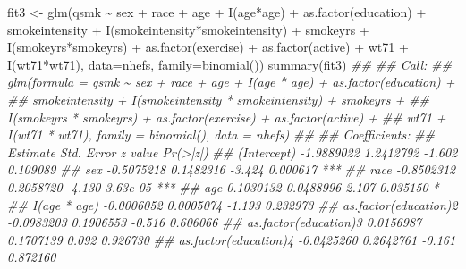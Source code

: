 \documentclass[
  10pt,
  a4paper,
]{book}
\newenvironment{Shaded}{\begin{snugshade}}{\end{snugshade}}
\newcommand{\AttributeTok}[1]{\textcolor[rgb]{0.40,0.45,0.13}{#1}}
\newcommand{\DocumentationTok}[1]{\textcolor[rgb]{0.37,0.37,0.37}{\textit{#1}}}
\newcommand{\FunctionTok}[1]{\textcolor[rgb]{0.28,0.35,0.67}{#1}}
\newcommand{\NormalTok}[1]{\textcolor[rgb]{0.00,0.46,0.62}{#1}}
\newcommand{\OtherTok}[1]{\textcolor[rgb]{0.00,0.46,0.62}{#1}}
\newcommand{\SpecialCharTok}[1]{\textcolor[rgb]{0.37,0.37,0.37}{#1}}
\begin{document}
\begin{Shaded}
\begin{Highlighting}[]
\NormalTok{fit3 }\OtherTok{\textless{}{-}} \FunctionTok{glm}\NormalTok{(qsmk }\SpecialCharTok{\textasciitilde{}}\NormalTok{ sex }\SpecialCharTok{+}\NormalTok{ race }\SpecialCharTok{+}\NormalTok{ age }\SpecialCharTok{+} \FunctionTok{I}\NormalTok{(age}\SpecialCharTok{*}\NormalTok{age) }\SpecialCharTok{+} \FunctionTok{as.factor}\NormalTok{(education)}
            \SpecialCharTok{+}\NormalTok{ smokeintensity }\SpecialCharTok{+} \FunctionTok{I}\NormalTok{(smokeintensity}\SpecialCharTok{*}\NormalTok{smokeintensity) }\SpecialCharTok{+}\NormalTok{ smokeyrs}
            \SpecialCharTok{+} \FunctionTok{I}\NormalTok{(smokeyrs}\SpecialCharTok{*}\NormalTok{smokeyrs) }\SpecialCharTok{+} \FunctionTok{as.factor}\NormalTok{(exercise) }\SpecialCharTok{+} \FunctionTok{as.factor}\NormalTok{(active)}
            \SpecialCharTok{+}\NormalTok{ wt71 }\SpecialCharTok{+} \FunctionTok{I}\NormalTok{(wt71}\SpecialCharTok{*}\NormalTok{wt71), }\AttributeTok{data=}\NormalTok{nhefs, }\AttributeTok{family=}\FunctionTok{binomial}\NormalTok{())}
\FunctionTok{summary}\NormalTok{(fit3)}
\DocumentationTok{\#\# }
\DocumentationTok{\#\# Call:}
\DocumentationTok{\#\# glm(formula = qsmk \textasciitilde{} sex + race + age + I(age * age) + as.factor(education) + }
\DocumentationTok{\#\#     smokeintensity + I(smokeintensity * smokeintensity) + smokeyrs + }
\DocumentationTok{\#\#     I(smokeyrs * smokeyrs) + as.factor(exercise) + as.factor(active) + }
\DocumentationTok{\#\#     wt71 + I(wt71 * wt71), family = binomial(), data = nhefs)}
\DocumentationTok{\#\# }
\DocumentationTok{\#\# Coefficients:}
\DocumentationTok{\#\#                                      Estimate Std. Error z value Pr(\textgreater{}|z|)    }
\DocumentationTok{\#\# (Intercept)                        {-}1.9889022  1.2412792  {-}1.602 0.109089    }
\DocumentationTok{\#\# sex                                {-}0.5075218  0.1482316  {-}3.424 0.000617 ***}
\DocumentationTok{\#\# race                               {-}0.8502312  0.2058720  {-}4.130 3.63e{-}05 ***}
\DocumentationTok{\#\# age                                 0.1030132  0.0488996   2.107 0.035150 *  }
\DocumentationTok{\#\# I(age * age)                       {-}0.0006052  0.0005074  {-}1.193 0.232973    }
\DocumentationTok{\#\# as.factor(education)2              {-}0.0983203  0.1906553  {-}0.516 0.606066    }
\DocumentationTok{\#\# as.factor(education)3               0.0156987  0.1707139   0.092 0.926730    }
\DocumentationTok{\#\# as.factor(education)4              {-}0.0425260  0.2642761  {-}0.161 0.872160    }

\end{Highlighting}
\end{Shaded}
\end{document}
